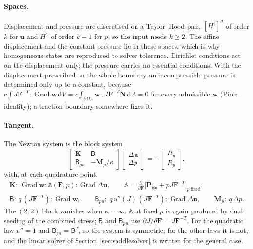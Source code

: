 \documentclass[11pt]{article}
\newcommand{\ud}{\,\mathrm{d}}
\newcommand{\Grad}{\operatorname{Grad}}
\newcommand{\bu}{\bm{u}}
\newcommand{\bw}{\bm{w}}
\newcommand{\bN}{\bm{N}}
\newcommand{\bP}{\bm{P}}
\newcommand{\bF}{\bm{F}}
\newcommand{\bA}{\mathbb{A}}
\newcommand{\bK}{\bm{K}}
\newcommand{\bM}{\bm{M}}
\newcommand{\bBm}{\bm{\mathsf{B}}}
\begin{document}
\paragraph{Spaces.}
Displacement and pressure are discretised on a Taylor--Hood pair,
$[H^1]^d$ of order $k$ for $\bu$ and $H^1$ of order $k - 1$ for $p$, so the
input needs $k \ge 2$.  The affine displacement and the constant pressure
lie in these spaces, which is why homogeneous states are reproduced to
solver tolerance.  Dirichlet conditions act on the displacement only; the
pressure carries no essential conditions.  With the displacement prescribed
on the whole boundary an incompressible pressure is determined only up to a
constant, because
$c\int J\bF^{-T}:\Grad\bw\ud V = c\int_{\partial\Omega_R}\bw\cdot J\bF^{-T}\bN\ud A = 0$
for every admissible $\bw$ (Piola identity); a traction boundary somewhere
fixes it.

\paragraph{Tangent.}
The Newton system is the block system
\begin{equation}
  \begin{bmatrix} \bK & \bBm \\ \bBm_{pu} & -\bM_p/\kappa \end{bmatrix}
  \begin{bmatrix} \Delta\bu \\ \Delta p \end{bmatrix}
  = -\begin{bmatrix} R_u \\ R_p \end{bmatrix},
  \label{eq:saddle}
\end{equation}
with, at each quadrature point,
\begin{gather}
  \bK: \ \Grad\bw:\bA(\bF, p):\Grad\Delta\bu, \qquad
  \bA = \frac{\partial}{\partial\bF}\bigl[\bP_{\mathrm{iso}} + pJ\bF^{-T}\bigr]_{p\ \text{fixed}}, \\
  \bBm: \ q\,(J\bF^{-T}):\Grad\bw, \qquad
  \bBm_{pu}: \ q\,u''(J)\,(J\bF^{-T}):\Grad\Delta\bu, \qquad
  \bM_p: \ q\,\Delta p .
\end{gather}
The $(2,2)$ block vanishes when $\kappa = \infty$.  $\bA$ at fixed $p$ is
again produced by dual seeding of the combined stress; $\bBm$ and
$\bBm_{pu}$ use $\partial J/\partial\bF = J\bF^{-T}$.  For the quadratic
law $u'' = 1$ and $\bBm_{pu} = \bBm^T$, so the system is symmetric; for the
other laws it is not, and the linear solver of
Section~\ref{sec:saddlesolver} is written for the general case.
\end{document}
